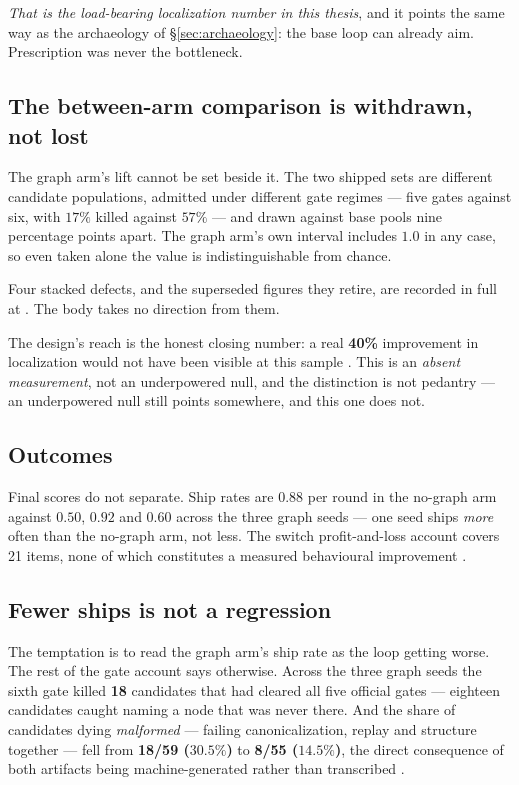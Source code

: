 \emph{That is the load-bearing localization number in this thesis}, and it
points the same way as the archaeology of \S\ref{sec:archaeology}: the base
loop can already aim. Prescription was never the bottleneck.

\subsection*{The between-arm comparison is withdrawn, not lost}

The graph arm's lift cannot be set beside it. The two shipped sets are
different candidate populations, admitted under different gate regimes ---
five gates against six, with $17\%$ killed against $57\%$ --- and drawn
against base pools nine percentage points apart. The graph arm's own
interval includes $1.0$ in any case, so even taken alone the value is
indistinguishable from chance.

Four stacked defects, and the superseded figures they retire, are recorded
in full at . The body takes no direction from them.

The design's reach is the honest closing number: a real \textbf{40\%}
improvement in localization would not have been visible at this sample
. This is an \emph{absent measurement}, not an underpowered null, and
the distinction is not pedantry --- an underpowered null still points
somewhere, and this one does not.

\subsection*{Outcomes}

Final scores do not separate. Ship rates are $0.88$ per round in the
no-graph arm against $0.50$, $0.92$ and $0.60$ across the three graph
seeds  --- one seed ships \emph{more} often than the no-graph arm,
not less. The switch
profit-and-loss account covers 21 items, none of which constitutes a measured
behavioural improvement .

\subsection*{Fewer ships is not a regression}

The temptation is to read the graph arm's ship rate as the loop getting
worse.
The rest of the gate account says otherwise. Across the three graph seeds
the sixth gate killed \textbf{18} candidates that had cleared all five
official gates --- eighteen candidates caught naming a node that was never
there. And the share of candidates dying \emph{malformed} --- failing
canonicalization, replay and structure together --- fell from
\textbf{18/59 ($30.5\%$)} to \textbf{8/55 ($14.5\%$)}, the direct
consequence of both artifacts being machine-generated rather than
transcribed .


